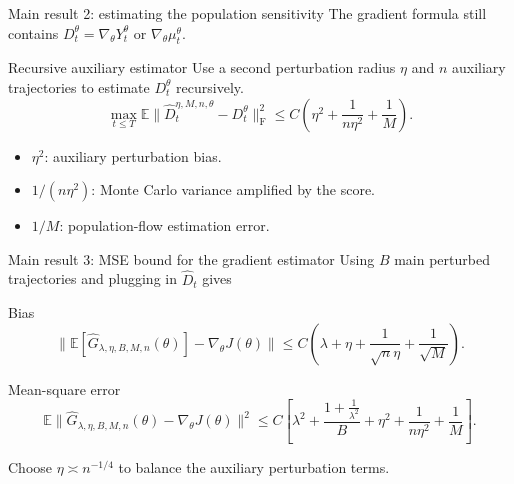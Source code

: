 \documentclass[9pt]{beamer}
\def\E{{\mathbb E}}
\begin{document}
\begin{frame}{Main result 2: estimating the population sensitivity}
The gradient formula still contains $D_t^\theta=\nabla_\theta Y_t^\theta$ or $\nabla_\theta\mu_t^\theta$.
\begin{block}{Recursive auxiliary estimator}
Use a second perturbation radius $\eta$ and $n$ auxiliary trajectories to estimate $D_t^\theta$ recursively.
\[
  \max_{t\leq T}\E\|\widehat D_t^{\eta,M,n,\theta}-D_t^\theta\|_{\mathrm F}^2
  \leq C\left(\eta^2+\frac{1}{n\eta^2}+\frac{1}{M}\right).
\]
\end{block}
\begin{itemize}
  \item $\eta^2$: auxiliary perturbation bias.
  \item $1/(n\eta^2)$: Monte Carlo variance amplified by the score.
  \item $1/M$: population-flow estimation error.
\end{itemize}
\end{frame}

\begin{frame}{Main result 3: MSE bound for the gradient estimator}
Using $B$ main perturbed trajectories and plugging in $\widehat D_t$ gives
\begin{block}{Bias}
\[
  \big\|\E[\widehat G_{\lambda,\eta,B,M,n}(\theta)]-\nabla_\theta J(\theta)\big\|
  \leq C\left(\lambda+\eta+\frac{1}{\sqrt n\eta}+\frac1{\sqrt M}\right).
\]
\end{block}
\begin{block}{Mean-square error}
\[
  \E\|\widehat G_{\lambda,\eta,B,M,n}(\theta)-\nabla_\theta J(\theta)\|^2
  \leq C\left[\lambda^2+\frac{1+\frac{1}{\lambda^2}}{B}
  +\eta^2+\frac{1}{n\eta^2}+\frac1M\right].
\]
\end{block}
\begin{center}
\small
Choose $\eta\asymp n^{-1/4}$ to balance the auxiliary perturbation terms.
\end{center}
\end{frame}
\end{document}
